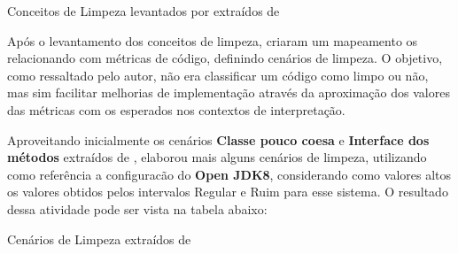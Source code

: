  \begin{table}[!ht]
\centering

\caption{Conceitos de Limpeza levantados por  extraídos de }
\label{tab:conceitos}
\end{table}
\FloatBarrier

Após o levantamento dos conceitos de limpeza,  criaram um mapeamento os relacionando com métricas de código, definindo cenários de limpeza. O objetivo, como ressaltado pelo autor, não era classificar um código como limpo ou não, mas sim facilitar melhorias de implementação através da aproximação dos valores das métricas com os esperados nos contextos de interpretação.

Aproveitando inicialmente os cenários \textbf{Classe pouco coesa} e \textbf{Interface dos métodos} extraídos de  ,  elaborou mais alguns cenários de limpeza, utilizando como referência a configuracão do \textbf{Open JDK8}, considerando como valores altos os valores obtidos pelos intervalos  Regular e Ruim para esse sistema. O resultado dessa atividade pode ser vista na tabela abaixo:

\begin{table}
\begin{table}[H]
\centering

\caption{Cenários de Limpeza extraídos de }
\label{tab:cenarios}
\end{table}
\FloatBarrier
\end{table}  

  